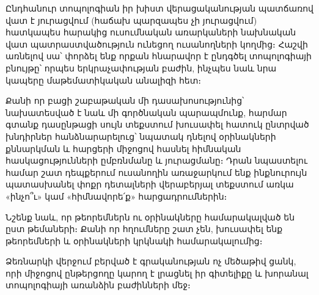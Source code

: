 \documentclass[./main.tex]{subfiles}
\begin{document}
\par Ընդհանուր տոպոլոգիան իր խիստ վերացականության պատճառով վատ է յու\-րաց\-վում (հաճախ պարզապես չի յուրացվում) հատկապես հարակից ուսումնական առար\-կաների նախնական վատ պատրաստվածություն ունեցող ուսանողների կող\-մից։ Հաշվի առնելով սա՝ փորձել ենք որքան հնարավոր է ընդգծել տոպոլոգիայի բնույթը՝ որպես երկրաչափության բաժին, ինչպես նաև նրա կապերը մա\-թե\-մա\-տի\-կական անալիզի հետ։
\par Քանի որ բացի շաբաթական մի դասախոսությունից՝ նախատեսված է նաև մի գործ\-նական պարապմունք, հարմար գտանք դասընթացի սույն տեքստում խուսա\-փել հատուկ ընտրված խնդիրներ հանձնարարելուց՝ նպատակ դնելով օրինակների քննարկ\-ման և հարցերի միջոցով հասնել հիմնական հասկացությունների ըմբռնմա\-նը և յու\-րացմանը։ Դրան նպաստելու համար շատ դեպքերում ուսանողին առա\-ջար\-կում ենք ինքնուրույն պատասխանել փոքր դետալների վերաբերյալ տեքստում առ\-կա «ինչո՞ւ» կամ «հիմնավորե՛ք» հարցադրումներին։ 
\par Նշենք նաև, որ թեորեմներն ու օրինակները համարակալված են ըստ թեմաների։ Քանի որ հղումները շատ չեն, խուսափել ենք թեորեմների և օրինակների կրկնակի համարակալումից։
\par Ձեռնարկի վերջում բերված է գրականության ոչ մեծաթիվ ցանկ, որի միջոցով ընթերցողը կարող է լրացնել իր գիտելիքը և խորանալ տոպոլոգիայի առանձին բաժինների մեջ։
\end{document}
